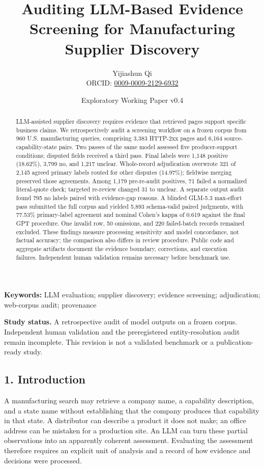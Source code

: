 \documentclass[10pt]{article}
\title{\vspace{-1.5em}\Large\bfseries Auditing LLM-Based Evidence Screening for Manufacturing Supplier Discovery}
\author{\normalsize Yijiashun Qi\\[-2pt]\small ORCID: \href{https://orcid.org/0009-0009-2129-6932}{0009-0009-2129-6932}}
\date{\small Exploratory Working Paper v0.4}
\begin{document}
\maketitle
\thispagestyle{fancy}
\vspace{-1.4em}
\begin{abstract}
\noindent LLM-assisted supplier discovery requires evidence that retrieved pages support specific business claims. We retrospectively audit a screening workflow on a frozen corpus from 960 U.S. manufacturing queries, comprising 3,383 HTTP-2xx pages and 6,164 source-capability-state pairs. Two passes of the same model assessed five producer-support conditions; disputed fields received a third pass. Final labels were 1,148 positive (18.62\%), 3,799 no, and 1,217 unclear. Whole-record adjudication overwrote 321 of 2,145 agreed primary labels routed for other disputes (14.97\%); fieldwise merging preserved those agreements. Among 1,179 pre-re-audit positives, 71 failed a normalized literal-quote check; targeted re-review changed 31 to unclear. A separate output audit found 795 no labels paired with evidence-gap reasons. A blinded GLM-5.3 max-effort pass submitted the full corpus and yielded 5,893 schema-valid paired judgments, with 77.53\% primary-label agreement and nominal Cohen's kappa of 0.619 against the final GPT procedure. One invalid row, 50 omissions, and 220 failed-batch records remained excluded. These findings measure processing sensitivity and model concordance, not factual accuracy; the comparison also differs in review procedure. Public code and aggregate artifacts document the evidence boundary, corrections, and execution failures. Independent human validation remains necessary before benchmark use.
\end{abstract}
\noindent\textbf{Keywords:} LLM evaluation; supplier discovery; evidence screening; adjudication; web-corpus audit; provenance

\smallskip
{\small\textbf{Study status.} A retrospective audit of model outputs on a frozen corpus. Independent human validation and the preregistered entity-resolution audit remain incomplete. This revision is not a validated benchmark or a publication-ready study.\par}
\hypertarget{introduction}{%
\subsection{1. Introduction}\label{introduction}}

A manufacturing search may retrieve a company name, a capability description, and a state name without establishing that the company produces that capability in that state. A distributor can describe a product it does not make; an office address can be mistaken for a production site. An LLM can turn these partial observations into an apparently coherent assessment. Evaluating the assessment therefore requires an explicit unit of analysis and a record of how evidence and decisions were processed.
\end{document}
